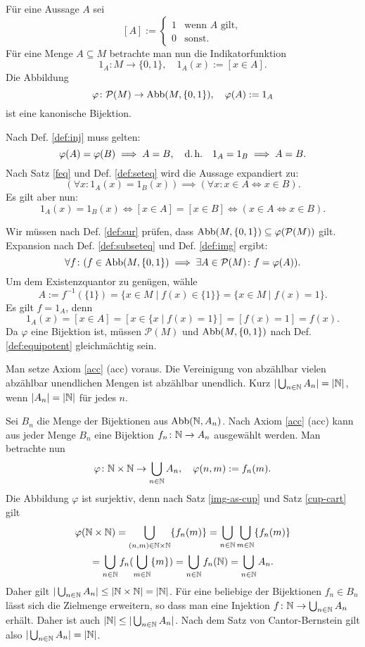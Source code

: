 \begin{Beweis}
Für eine Aussage $A$ sei
\[[A] := \begin{cases}
1&\text{wenn $A$ gilt},\\
0&\text{sonst}.
\end{cases}\]
Für eine Menge $A\subseteq M$ betrachte man nun die
Indikatorfunktion
\[1_A\colon M\to\{0,1\},\quad 1_A(x):=[x\in A].\]
Die Abbildung
\[\varphi\colon\mathcal P(M)\to\operatorname{Abb}(M,\{0,1\}),\quad \varphi(A):=1_A\]
ist eine kanonische Bijektion.

Nach Def. \ref{def:inj} muss gelten:
\[\varphi(A)=\varphi(B)\implies A=B,\quad\text{d.\,h.}\quad
1_A=1_B \implies A=B.\]
Nach Satz \ref{feq} und Def. \ref{def:seteq}
wird die Aussage expandiert zu:
\[(\forall x\colon 1_A(x)=1_B(x))\implies
(\forall x\colon x\in A\iff x\in B).\]
Es gilt aber nun:
\[1_A(x)=1_B(x)\iff [x\in A]=[x\in B] \iff (x\in A\iff x\in B).\]
\end{Beweis}
 Wir müssen nach Def. \ref{def:sur}
prüfen, dass $\operatorname{Abb}(M,\{0,1\})\subseteq \varphi(\mathcal P(M))$ gilt.
Expansion nach Def. \ref{def:subseteq} und Def. \ref{def:img} ergibt:
\[\forall f\colon (f\in\operatorname{Abb}(M,\{0,1\})\implies\exists A\in\mathcal P(M)\colon f=\varphi(A)).\]
Um dem Existenzquantor zu genügen, wähle
\[A := f^{-1}(\{1\}) = \{x\in M\mid f(x)\in \{1\}\} = \{x\in M\mid f(x)=1\}.\]
Es gilt $f=1_A$, denn
\[1_A(x) = [x\in A] = [x\in\{x\mid f(x)=1\}] = [f(x)=1] = f(x).\]
Da $\varphi$ eine Bijektion ist, müssen $\mathcal P(M)$ und $\operatorname{Abb}(M,\{0,1\})$
nach Def. \ref{def:equipotent} gleichmächtig
sein.\,\qedsymbol

\newpage
\begin{Satz}\label{countable-union-countable}
Man setze Axiom \ref{acc} (acc) voraus.
Die Vereinigung von abzählbar vielen abzählbar unendlichen Mengen
ist abzählbar unendlich. Kurz $|\bigcup_{n\in\mathbb N} A_n| = |\mathbb N|$, wenn
$|A_n|=|\mathbb N|$ für jedes $n$.
\end{Satz}

\begin{Beweis}
Sei $B_n$ die Menge der Bijektionen aus $\operatorname{Abb}(\mathbb N,A_n)$. 
Nach Axiom \ref{acc} (acc) kann aus jeder Menge $B_n$
eine Bijektion $f_n\colon\mathbb N\to A_n$ ausgewählt werden.
Man betrachte nun
\[\varphi\colon\mathbb N\times\mathbb N\to\bigcup_{n\in\mathbb N} A_n,\quad
\varphi(n,m):=f_n(m).\]
Die Abbildung $\varphi$ ist surjektiv, denn nach
Satz \ref{img-as-cup} und Satz \ref{cup-cart} gilt
\begin{gather*}
\varphi(\mathbb N\times\mathbb N) = \bigcup_{(n,m)\in\mathbb N{\times}\mathbb N} \{f_n(m)\}
= \bigcup_{n\in\mathbb N}\bigcup_{m\in\mathbb N} \{f_n(m)\}\\
= \bigcup_{n\in\mathbb N} f_n(\bigcup_{m\in\mathbb N} \{m\})
= \bigcup_{n\in\mathbb N} f_n(\mathbb N) = \bigcup_{n\in\mathbb N} A_n.
\end{gather*}
Daher gilt $|\bigcup_{n\in\mathbb N} A_n|\le |\mathbb N\times \mathbb N| = |\mathbb N|$.
Für eine beliebige der Bijektionen $f_n\in B_n$ lässt sich die Zielmenge
erweitern, so dass man eine Injektion $f\colon\mathbb N\to\bigcup_{n\in\mathbb N} A_n$
erhält. Daher ist auch $|\mathbb N|\le |\bigcup_{n\in\mathbb N} A_n|$. Nach dem
Satz von Cantor-Bernstein gilt also
$|\bigcup_{n\in\mathbb N} A_n|=|\mathbb N|$.\,\qedsymbol
\end{Beweis}

